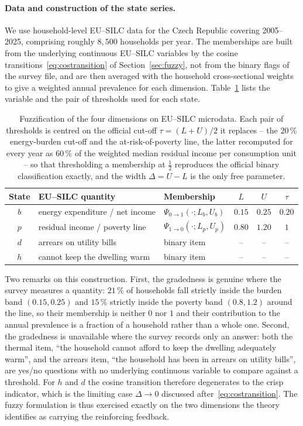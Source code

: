 \documentclass[11pt,a4paper]{article}
\begin{document}
\paragraph{Data and construction of the state series.}
We use household-level EU--SILC data for the Czech Republic covering 2005--2025, comprising roughly $8{,}500$ households per year. The memberships are built from the underlying continuous EU--SILC variables by the cosine transitions~\eqref{eq:costransition} of Section~\ref{sec:fuzzy}, not from the binary flags of the survey file, and are then averaged with the household cross-sectional weights to give a weighted annual prevalence for each dimension. Table~\ref{tab:silc-fuzzification} lists the variable and the pair of thresholds used for each state.

\begin{table}[htbp]
\centering
\small
\begin{tabular}{cllccc}
\toprule
\textbf{State} & \textbf{EU--SILC quantity} & \textbf{Membership} & $L$ & $U$ & $\tau$ \\
\midrule
$b$ & energy expenditure / net income & $\Psi_{0\to1}(\cdot;L_b,U_b)$ & $0.15$ & $0.25$ & $0.20$ \\
$p$ & residual income / poverty line & $\Psi_{1\to0}(\cdot;L_p,U_p)$ & $0.80$ & $1.20$ & $1$ \\
$d$ & arrears on utility bills & binary item & -- & -- & -- \\
$h$ & cannot keep the dwelling warm & binary item & -- & -- & -- \\
\bottomrule
\end{tabular}
\caption{Fuzzification of the four dimensions on EU--SILC microdata. Each pair
of thresholds is centred on the official cut-off $\tau=(L+U)/2$ it replaces --
the $20\,\%$ energy-burden cut-off and the at-risk-of-poverty line, the latter
recomputed for every year as $60\,\%$ of the weighted median residual income
per consumption unit -- so that thresholding a membership at $\tfrac12$
reproduces the official binary classification exactly, and the width
$\Delta=U-L$ is the only free parameter.}
\label{tab:silc-fuzzification}
\end{table}

Two remarks on this construction. First, the gradedness is genuine where the survey measures a quantity: $21\,\%$ of households fall strictly inside the burden band $(0.15,0.25)$ and $15\,\%$ strictly inside the poverty band $(0.8,1.2)$ around the line, so their membership is neither $0$ nor $1$ and their contribution to the annual prevalence is a fraction of a household rather than a whole one. Second, the gradedness is unavailable where the survey records only an answer: both the thermal item, ``the household cannot afford to keep the dwelling adequately warm'', and the arrears item, ``the household has been in arrears on utility bills'', are yes/no questions with no underlying continuous variable to compare against a threshold. For $h$ and $d$ the cosine transition therefore degenerates to the crisp indicator, which is the limiting case $\Delta\to0$ discussed after~\eqref{eq:costransition}. The fuzzy formulation is thus exercised exactly on the two dimensions the theory identifies as carrying the reinforcing feedback.
\end{document}
